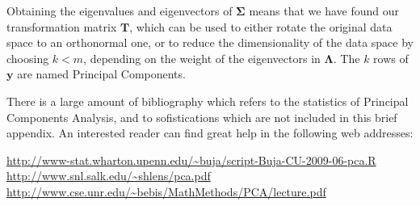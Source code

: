 Obtaining the eigenvalues and eigenvectors of $\mathbf{\Sigma}$ means
that we have found our transformation matrix $\mathbf{T}$, which can
be used to either rotate the original data space to an orthonormal
one, or to reduce the dimensionality of the data space by choosing
$k<m$, depending on the weight of the eigenvectors in
$\mathbf{\Lambda}$. The $k$ rows of $\mathbf{y}$ are named Principal
Components.

There is a large amount of bibliography which refers to the statistics
of Principal Components Analysis, and to sofistications which are not
included in this brief appendix. An interested reader can find great
help in the following web addresses:

\url{http://www-stat.wharton.upenn.edu/~buja/script-Buja-CU-2009-06-pca.R}
\url{http://www.snl.salk.edu/~shlens/pca.pdf}
\url{http://www.cse.unr.edu/~bebis/MathMethods/PCA/lecture.pdf}



